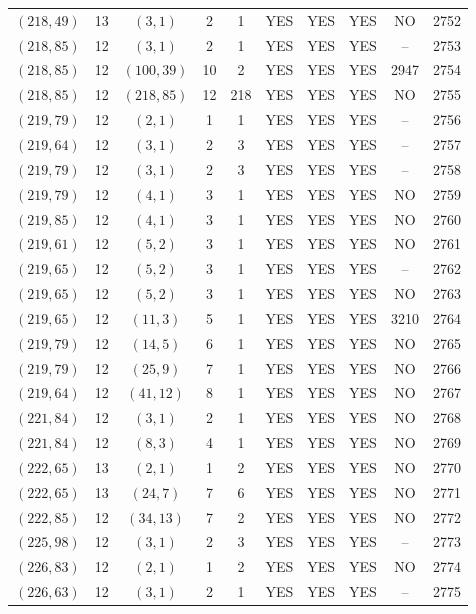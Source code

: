 \begin{longtable}{|c|c|c|c|c|c|c|c|c|c|}
$(218, 49)$ & 13 & $(3, 1)$ & 2 & 1 & YES & YES & YES & NO & 2752\\
$(218, 85)$ & 12 & $(3, 1)$ & 2 & 1 & YES & YES & YES & -- & 2753\\
$(218, 85)$ & 12 & $(100, 39)$ & 10 & 2 & YES & YES & YES & 2947 & 2754\\
$(218, 85)$ & 12 & $(218, 85)$ & 12 & 218 & YES & YES & YES & NO & 2755\\
$(219, 79)$ & 12 & $(2, 1)$ & 1 & 1 & YES & YES & YES & -- & 2756\\
$(219, 64)$ & 12 & $(3, 1)$ & 2 & 3 & YES & YES & YES & -- & 2757\\
$(219, 79)$ & 12 & $(3, 1)$ & 2 & 3 & YES & YES & YES & -- & 2758\\
$(219, 79)$ & 12 & $(4, 1)$ & 3 & 1 & YES & YES & YES & NO & 2759\\
$(219, 85)$ & 12 & $(4, 1)$ & 3 & 1 & YES & YES & YES & NO & 2760\\
$(219, 61)$ & 12 & $(5, 2)$ & 3 & 1 & YES & YES & YES & NO & 2761\\
$(219, 65)$ & 12 & $(5, 2)$ & 3 & 1 & YES & YES & YES & -- & 2762\\
$(219, 65)$ & 12 & $(5, 2)$ & 3 & 1 & YES & YES & YES & NO & 2763\\
$(219, 65)$ & 12 & $(11, 3)$ & 5 & 1 & YES & YES & YES & 3210 & 2764\\
$(219, 79)$ & 12 & $(14, 5)$ & 6 & 1 & YES & YES & YES & NO & 2765\\
$(219, 79)$ & 12 & $(25, 9)$ & 7 & 1 & YES & YES & YES & NO & 2766\\
$(219, 64)$ & 12 & $(41, 12)$ & 8 & 1 & YES & YES & YES & NO & 2767\\
$(221, 84)$ & 12 & $(3, 1)$ & 2 & 1 & YES & YES & YES & NO & 2768\\
$(221, 84)$ & 12 & $(8, 3)$ & 4 & 1 & YES & YES & YES & NO & 2769\\
$(222, 65)$ & 13 & $(2, 1)$ & 1 & 2 & YES & YES & YES & NO & 2770\\
$(222, 65)$ & 13 & $(24, 7)$ & 7 & 6 & YES & YES & YES & NO & 2771\\
$(222, 85)$ & 12 & $(34, 13)$ & 7 & 2 & YES & YES & YES & NO & 2772\\
$(225, 98)$ & 12 & $(3, 1)$ & 2 & 3 & YES & YES & YES & -- & 2773\\
$(226, 83)$ & 12 & $(2, 1)$ & 1 & 2 & YES & YES & YES & NO & 2774\\
$(226, 63)$ & 12 & $(3, 1)$ & 2 & 1 & YES & YES & YES & -- & 2775\\

\end{longtable}
